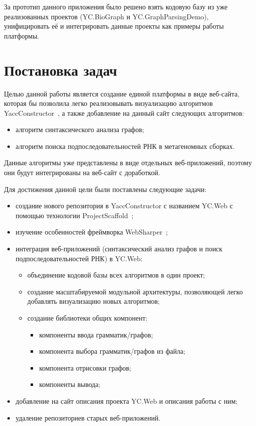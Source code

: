 \documentclass[14pt]{matmex-diploma-custom}
\begin{document}
За прототип данного приложения было решено взять кодовую базу из уже реализованных проектов (YC.BioGraph и YC.GraphParsingDemo), унифицировать её и интегрировать данные проекты как примеры работы платформы.


\section{Постановка задач}
Целью данной работы является создание единой платформы в виде веб-сайта, которая бы позволила легко реализовывать визуализацию алгоритмов YaccConstructor~\cite{yacconstructor}, а также добавление на данный сайт следующих алгоритмов: 

\begin{itemize}
\item алгоритм синтаксического анализа графов; 
\item алгоритм поиска подпоследовательностей РНК в метагеномных сборках. 
\end{itemize}

Данные алгоритмы уже представлены в виде отдельных \linebreak веб-приложений, поэтому они будут интегрированы на веб-сайт с доработкой. 


Для достижения данной цели были поставлены следующие задачи: 
\begin{itemize}
\item создание нового репозитория в YaccConstructor с названием 
    \linebreak  YC.Web с помощью технологии ProjectScaffold~\cite{prscaffold};
\item изучение особенностей фреймворка WebSharper~\cite{websharper};
\item интеграция веб-приложений (синтаксический анализ графов и поиск подпоследовательностей РНК) в YC.Web: 
    \begin{itemize}
    \item объединение кодовой базы всех алгоритмов в один проект;
    \item создание масштабируемой модульной архитектуры, позволяющей легко добавлять визуализацию новых алгоритмов;
    \item создание библиотеки общих компонент:
        \begin{itemize}
        \item компоненты ввода грамматик/графов;
        \item компонента выбора грамматик/графов из файла;
        \item компонента отрисовки графов;
        \item компоненты вывода;
        \end{itemize}
    \end{itemize}
\item добавление на сайт описания проекта YC.Web и описания работы с ним;
\item удаление репозиториев старых веб-приложений.
\end{itemize}
\end{document}
